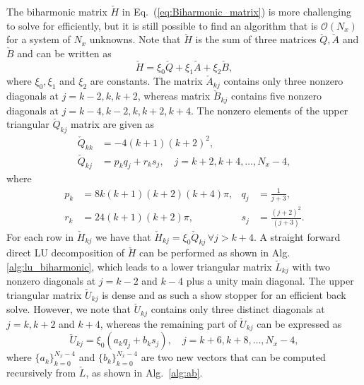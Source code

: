 \documentclass[11pt, oneside]{elsarticle}
\newcommand{\N}[1]{\check{#1}}
\begin{document}
The biharmonic matrix $\N{H}$ in Eq.~(\ref{eq:Biharmonic_matrix}) is more 
challenging to solve for efficiently, but 
it is still possible to find an algorithm that is $\mathcal{O}(N_x)$ for a system of $N_x$ 
unknowns. Note 
that $\N{H}$ is the sum of three matrices $\N{Q}, \N{A}$ and $\N{B}$ and can be 
written as
\begin{equation}
\N{H} = \xi_0\N{Q} + \xi_1\N{A} + \xi_2 \N{B},
\end{equation}
where $\xi_0, \xi_1$ and $\xi_2$ are constants. The matrix $\N{A}_{kj}$ contains only 
three nonzero diagonals at $ j = k-2, k, k+2$,  whereas matrix $\N{B}_{kj}$ 
contains five 
nonzero diagonals at $ j = k-4, k-2, k, k+2, k+4$. The nonzero elements of the 
upper triangular $\N{Q}_{kj}$ matrix are given as
\begin{align}
\label{eq:N_Q}
 \N{Q}_{kk} &= -4(k+1)(k+2)^2, \\
 \N{Q}_{kj} &= p_kq_j + r_ks_j, \quad j = k+2, k+4, \ldots, N_x-4,
\end{align}
where 
\begin{align}
p_k &= 8 k (k+1)(k+2)(k+4)\pi, &q_j &= \frac{1}{j+3}, \label{eq:pk} \\
r_k &= 24(k+1)(k+2)\pi, &s_j &=  \frac{(j+2)^2}{(j+3)}. \label{eq:rk}
\end{align} 
For each row in $\N{H}_{kj}$ we have that $\N{H}_{kj}=\xi_0\N{Q}_{kj}\, \forall j 
> k+4$. A straight forward direct LU decomposition of $\N{H}$ can be performed 
as shown in Alg. 
\ref{alg:lu_biharmonic}, which leads to a lower triangular 
matrix $\N{L}_{kj}$ with two nonzero diagonals at $j=k-2$ and $k-4$ plus a 
unity 
main diagonal. The upper triangular matrix $\N{U}_{kj}$ is dense and as such a 
show stopper for an efficient back solve. However, we note that $\N{U}_{kj}$ 
contains only three distinct 
diagonals at $j=k, k+2$ and $k+4$, whereas the remaining part of $\N{U}_{kj}$ 
can be expressed as
\begin{equation}
\N{U}_{kj} = \xi_0(a_k q_j + b_k s_j), \quad j = k+6, k+8, \ldots, N_x-4, 
\label{eq:ab}
\end{equation}
where $\{a_k\}_{k=0}^{N_x-4}$ and $\{b_k\}_{k=0}^{N_x-4}$ are two new 
vectors that can be computed recursively from $\N{L}$, as shown in Alg.~\ref{alg:ab}. 
\end{document}
